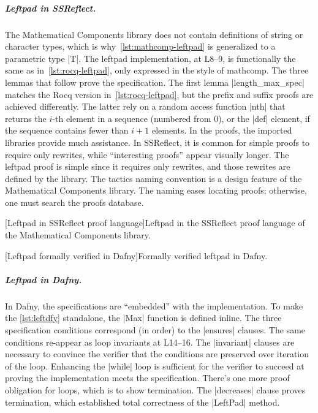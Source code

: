 \subparagraph*{Leftpad in SSReflect.}
The Mathematical Components library does not contain definitions of string or character types,
which is why~\autoref{lst:mathcomp-leftpad} is generalized to a parametric type \pr|T|.
The leftpad implementation, at L8--9, is functionally the same as in~\autoref{lst:rocq-leftpad},
only expressed in the style of mathcomp.
The three lemmas that follow prove the specification.
The first lemma \pr|length_max_spec| matches the Rocq version in~\autoref{lst:rocq-leftpad},
but the prefix and suffix proofs are achieved differently.
The latter rely on a random access function \pr|nth| that returns the \(i\)-th element in a sequence
(numbered from 0), or the \pr|def| element, if the sequence contains fewer than \(i+1\) elements.
In the proofs, the imported libraries provide much assistance.
In SSReflect, it is common for simple proofs to require only rewrites, while \enquote{interesting proofs} appear visually longer.
The leftpad proof is simple since it requires only rewrites, and those rewrites are defined by the library.
The tactics naming convention is a design feature of the Mathematical Components library.
The naming eases locating proofs;
otherwise, one must search the proofs database.

\begin{center}
\captionsetup{type=lstlisting}
\begin{minipage}{\linewidth}
[Leftpad in SSReflect proof language]{Leftpad in the SSReflect proof language of the Mathematical Components library.}
\label{lst:mathcomp-leftpad}
\end{minipage}
\end{center}

\begin{center}
\begin{minipage}{\linewidth}
\captionsetup{type=lstlisting}
[Leftpad formally verified in Dafny]{Formally verified leftpad in Dafny.}
\label{lst:leftdfy}
\end{minipage}
\end{center}

\subparagraph*{Leftpad in Dafny.}
In Dafny, the specifications are \enquote{embedded} with the implementation.
To make the \autoref{lst:leftdfy} standalone, the \pr|Max| function is defined inline.
The three specification conditions correspond (in order) to the \pr|ensures| clauses.
The same conditions re-appear as loop invariants at L14--16.
The \pr|invariant| clauses are necessary to convince the verifier that the conditions are preserved over iteration of the loop.
Enhancing the \pr|while| loop is sufficient for the verifier to succeed at proving the implementation meets the specification.
There's one more proof obligation for loops, which is to show termination.
The \pr|decreases| clause proves termination, which established total correctness of the \pr|LeftPad| method.

